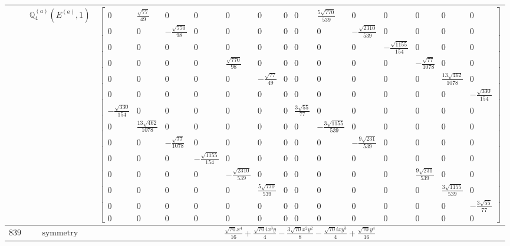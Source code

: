 \documentclass[fleqn,8pt,landscape]{jsarticle}
\begin{document}
\begin{longtable}{ccc}
$  $ & $ \mathbb{Q}_{4}^{(a)}(E^{(a)},1) $ & $ \begin{bmatrix} 0 & \frac{\sqrt{77}}{49} & 0 & 0 & 0 & 0 & 0 & 0 & \frac{5 \sqrt{770}}{539} & 0 & 0 & 0 & 0 & 0 \\ 0 & 0 & - \frac{\sqrt{770}}{98} & 0 & 0 & 0 & 0 & 0 & 0 & - \frac{\sqrt{2310}}{539} & 0 & 0 & 0 & 0 \\ 0 & 0 & 0 & 0 & 0 & 0 & 0 & 0 & 0 & 0 & - \frac{\sqrt{1155}}{154} & 0 & 0 & 0 \\ 0 & 0 & 0 & 0 & \frac{\sqrt{770}}{98} & 0 & 0 & 0 & 0 & 0 & 0 & - \frac{\sqrt{77}}{1078} & 0 & 0 \\ 0 & 0 & 0 & 0 & 0 & - \frac{\sqrt{77}}{49} & 0 & 0 & 0 & 0 & 0 & 0 & \frac{13 \sqrt{462}}{1078} & 0 \\ 0 & 0 & 0 & 0 & 0 & 0 & 0 & 0 & 0 & 0 & 0 & 0 & 0 & - \frac{\sqrt{330}}{154} \\ - \frac{\sqrt{330}}{154} & 0 & 0 & 0 & 0 & 0 & 0 & \frac{3 \sqrt{55}}{77} & 0 & 0 & 0 & 0 & 0 & 0 \\ 0 & \frac{13 \sqrt{462}}{1078} & 0 & 0 & 0 & 0 & 0 & 0 & - \frac{3 \sqrt{1155}}{539} & 0 & 0 & 0 & 0 & 0 \\ 0 & 0 & - \frac{\sqrt{77}}{1078} & 0 & 0 & 0 & 0 & 0 & 0 & - \frac{9 \sqrt{231}}{539} & 0 & 0 & 0 & 0 \\ 0 & 0 & 0 & - \frac{\sqrt{1155}}{154} & 0 & 0 & 0 & 0 & 0 & 0 & 0 & 0 & 0 & 0 \\ 0 & 0 & 0 & 0 & - \frac{\sqrt{2310}}{539} & 0 & 0 & 0 & 0 & 0 & 0 & \frac{9 \sqrt{231}}{539} & 0 & 0 \\ 0 & 0 & 0 & 0 & 0 & \frac{5 \sqrt{770}}{539} & 0 & 0 & 0 & 0 & 0 & 0 & \frac{3 \sqrt{1155}}{539} & 0 \\ 0 & 0 & 0 & 0 & 0 & 0 & 0 & 0 & 0 & 0 & 0 & 0 & 0 & - \frac{3 \sqrt{55}}{77} \\ 0 & 0 & 0 & 0 & 0 & 0 & 0 & 0 & 0 & 0 & 0 & 0 & 0 & 0 \end{bmatrix} $ \\ \hline
$ 839 $ & $ \text{symmetry} $ & $ \frac{\sqrt{70} x^{4}}{16} + \frac{\sqrt{70} i x^{3} y}{4} - \frac{3 \sqrt{70} x^{2} y^{2}}{8} - \frac{\sqrt{70} i x y^{3}}{4} + \frac{\sqrt{70} y^{4}}{16} $ \\

\end{longtable}
\end{document}
